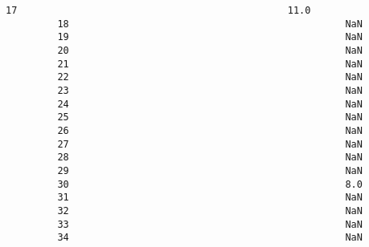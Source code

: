 \documentclass[11pt]{article}
\begin{document}
\begin{Verbatim}[commandchars=\\\{\}]
         17                                               11.0                                                                                      
         18                                                NaN                                                                                      
         19                                                NaN                                                                                      
         20                                                NaN                                                                                      
         21                                                NaN                                                                                      
         22                                                NaN                                                                                      
         23                                                NaN                                                                                      
         24                                                NaN                                                                                      
         25                                                NaN                                                                                      
         26                                                NaN                                                                                      
         27                                                NaN                                                                                      
         28                                                NaN                                                                                      
         29                                                NaN                                                                                      
         30                                                8.0                                                                                      
         31                                                NaN                                                                                      
         32                                                NaN                                                                                      
         33                                                NaN                                                                                      
         34                                                NaN                                                                                      

\end{Verbatim}
\end{document}
